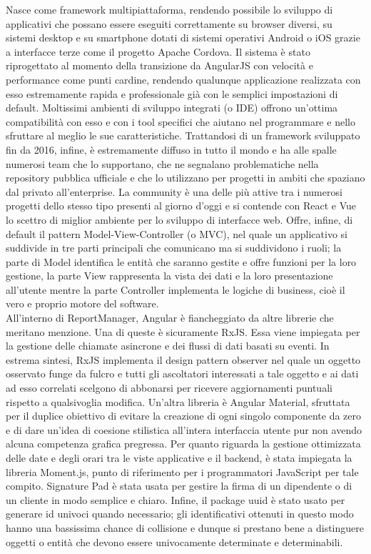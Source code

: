 Nasce come framework multipiattaforma, rendendo possibile lo sviluppo di applicativi che possano essere eseguiti correttamente su browser diversi, su sistemi desktop e su 
smartphone dotati di sistemi operativi Android o iOS grazie a interfacce terze come il progetto Apache Cordova.
Il sistema è stato riprogettato al momento della transizione da AngularJS con velocità e performance come punti cardine, rendendo qualunque applicazione realizzata con esso estremamente
rapida e professionale già con le semplici impostazioni di default.
Moltissimi ambienti di sviluppo integrati (o IDE) offrono un'ottima compatibilità con esso e con i tool specifici che aiutano nel programmare e nello sfruttare al meglio le sue 
caratteristiche.
Trattandosi di un framework sviluppato fin da 2016, infine, è estremamente diffuso in tutto il mondo e ha alle spalle numerosi team che lo supportano,
che ne segnalano problematiche nella repository pubblica ufficiale e che lo utilizzano per progetti in ambiti che spaziano dal privato all'enterprise.
La community è una delle più attive tra i numerosi progetti dello stesso tipo presenti al giorno d'oggi e si contende con React e Vue lo scettro di miglior ambiente per lo 
sviluppo di interfacce web.
Offre, infine, di default il pattern Model-View-Controller (o MVC), nel quale un applicativo si suddivide in tre parti principali che comunicano ma si suddividono i ruoli;
la parte di Model identifica le entità che saranno gestite e offre funzioni per la loro gestione, la parte View rappresenta la vista dei dati e la loro presentazione all'utente mentre
la parte Controller implementa le logiche di business, cioè il vero e proprio motore del software.
\\
All'interno di ReportManager, Angular è fiancheggiato da altre librerie che meritano menzione.
Una di queste è sicuramente RxJS. Essa viene impiegata per la gestione delle chiamate asincrone e dei flussi di dati basati su eventi.
In estrema sintesi, RxJS implementa il design pattern observer nel quale un oggetto osservato funge da fulcro e tutti gli ascoltatori interessati a tale oggetto e ai dati ad esso
correlati scelgono di abbonarsi per ricevere aggiornamenti puntuali rispetto a qualsivoglia modifica.
Un'altra libreria è Angular Material, sfruttata per il duplice obiettivo di evitare la creazione di ogni singolo componente da zero e di dare un'idea di coesione stilistica
all'intera interfaccia utente pur non avendo alcuna competenza grafica pregressa.
Per quanto riguarda la gestione ottimizzata delle date e degli orari tra le viste applicative e il backend, è stata impiegata la libreria Moment.js, punto di riferimento per i 
programmatori JavaScript per tale compito.
Signature Pad è stata usata per gestire la firma di un dipendente o di un cliente in modo semplice e chiaro.
Infine, il package uuid è stato usato per generare id univoci quando necessario; gli identificativi ottenuti in questo modo hanno una bassissima chance di collisione e dunque si
prestano bene a distinguere oggetti o entità che devono essere univocamente determinate e determinabili.

